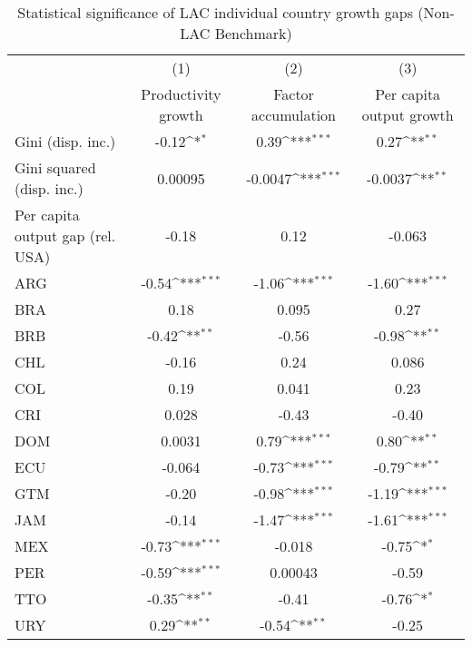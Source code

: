 \begin{sidewaystable}[htbp]\centering
\def\sym#1{\ifmmode^{#1}\else\(^{#1}\)\fi}
\caption{Statistical significance of LAC individual country growth gaps (Non-LAC Benchmark)}
\begin{tabular}{l*{3}{c}}
\toprule
                &\multicolumn{1}{c}{(1)}&\multicolumn{1}{c}{(2)}&\multicolumn{1}{c}{(3)}\\
                &\multicolumn{1}{c}{Productivity growth}&\multicolumn{1}{c}{Factor accumulation}&\multicolumn{1}{c}{Per capita output growth}\\
\midrule
Gini (disp. inc.)&    -0.12\sym{*}  &     0.39\sym{***}&     0.27\sym{**} \\
Gini squared (disp. inc.)&  0.00095         &  -0.0047\sym{***}&  -0.0037\sym{**} \\
Per capita output gap (rel. USA)&    -0.18         &     0.12         &   -0.063         \\
ARG             &    -0.54\sym{***}&    -1.06\sym{***}&    -1.60\sym{***}\\
BRA             &     0.18         &    0.095         &     0.27         \\
BRB             &    -0.42\sym{**} &    -0.56         &    -0.98\sym{**} \\
CHL             &    -0.16         &     0.24         &    0.086         \\
COL             &     0.19         &    0.041         &     0.23         \\
CRI             &    0.028         &    -0.43         &    -0.40         \\
DOM             &   0.0031         &     0.79\sym{***}&     0.80\sym{**} \\
ECU             &   -0.064         &    -0.73\sym{***}&    -0.79\sym{**} \\
GTM             &    -0.20         &    -0.98\sym{***}&    -1.19\sym{***}\\
JAM             &    -0.14         &    -1.47\sym{***}&    -1.61\sym{***}\\
MEX             &    -0.73\sym{***}&   -0.018         &    -0.75\sym{*}  \\
PER             &    -0.59\sym{***}&  0.00043         &    -0.59         \\
TTO             &    -0.35\sym{**} &    -0.41         &    -0.76\sym{*}  \\
URY             &     0.29\sym{**} &    -0.54\sym{**} &    -0.25         \\

\end{tabular}
\end{sidewaystable}
